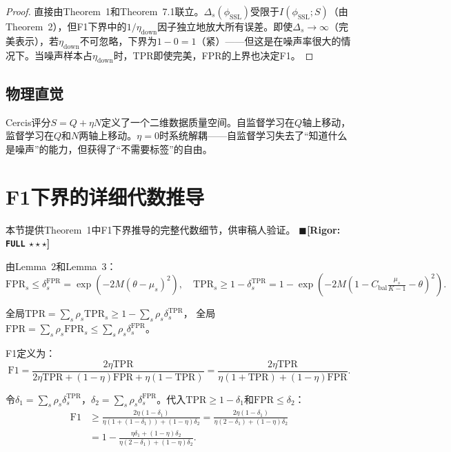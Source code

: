 \documentclass[12pt,a4paper]{ctexart}
\theoremstyle{definition}
\theoremstyle{remark}
\newcommand{\rigorFull}{$\blacksquare$\;\textbf{[Rigor: \texttt{FULL} $\star\star\star$]}}
\begin{document}
\begin{proof}
直接由Theorem~1和Theorem~7.1联立。$\Delta_s(\phi_{\text{SSL}})$受限于$I(\phi_{\text{SSL}}; S)$（由Theorem~2），但F1下界中的$1/\eta_{\text{down}}$因子独立地放大所有误差。即使$\Delta_s \to \infty$（完美表示），若$\eta_{\text{down}}$不可忽略，下界为$1-0=1$（紧）——但这是在噪声率很大的情况下。当噪声样本占$\eta_{\text{down}}$时，TPR即使完美，FPR的上界也决定F1。
\end{proof}

\subsection{物理直觉}
Cercis评分$S = Q + \eta N$定义了一个二维数据质量空间。自监督学习在$Q$轴上移动，监督学习在$Q$和$N$两轴上移动。$\eta = 0$时系统解耦——自监督学习失去了``知道什么是噪声''的能力，但获得了``不需要标签''的自由。

\section{F1下界的详细代数推导}
\label{sec:f1-derivation-detail}

本节提供Theorem~1中F1下界推导的完整代数细节，供审稿人验证。
\rigorFull

由Lemma~2和Lemma~3：
\begin{equation}
\mathrm{FPR}_s \leq \delta_s^{\text{FPR}} = \exp(-2M(\theta-\mu_s)^2), \quad
\mathrm{TPR}_s \geq 1 - \delta_s^{\text{TPR}} = 1 - \exp(-2M(1-C_{\text{bal}}\tfrac{\mu_s}{K-1}-\theta)^2).
\end{equation}

全局$\mathrm{TPR} = \sum_s \rho_s \mathrm{TPR}_s \geq 1 - \sum_s \rho_s \delta_s^{\text{TPR}}$，
全局$\mathrm{FPR} = \sum_s \rho_s \mathrm{FPR}_s \leq \sum_s \rho_s \delta_s^{\text{FPR}}$。

F1定义为：
\begin{equation}
\mathrm{F1} = \frac{2\eta\mathrm{TPR}}{2\eta\mathrm{TPR} + (1-\eta)\mathrm{FPR} + \eta(1-\mathrm{TPR})}
          = \frac{2\eta\mathrm{TPR}}{\eta(1+\mathrm{TPR}) + (1-\eta)\mathrm{FPR}}.
\end{equation}

令$\delta_1 = \sum_s \rho_s \delta_s^{\text{TPR}}$，$\delta_2 = \sum_s \rho_s \delta_s^{\text{FPR}}$。代入$\mathrm{TPR} \geq 1-\delta_1$和$\mathrm{FPR} \leq \delta_2$：
\begin{align}
\mathrm{F1} &\geq \frac{2\eta(1-\delta_1)}{\eta(1+(1-\delta_1)) + (1-\eta)\delta_2}
            = \frac{2\eta(1-\delta_1)}{\eta(2-\delta_1) + (1-\eta)\delta_2} \\
            &= 1 - \frac{\eta\delta_1 + (1-\eta)\delta_2}{\eta(2-\delta_1) + (1-\eta)\delta_2}.
\end{align}
\end{document}
